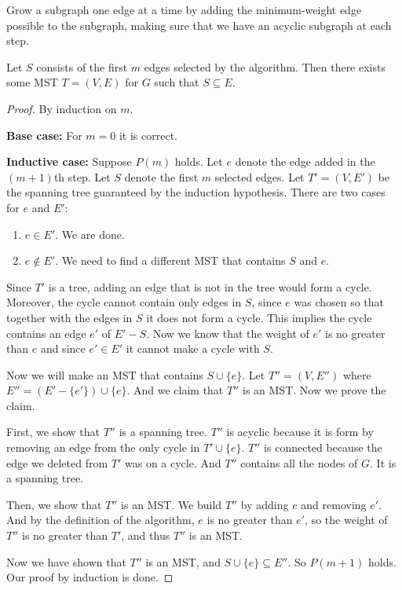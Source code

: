 \documentclass[11pt]{article}
\begin{document}
\begin{definition}
Grow a subgraph one edge at a time by adding the minimum-weight edge possible to the subgraph,
making sure that we have an acyclic subgraph at each step.
\end{definition}

\begin{lemma} \label{lemma:83}
Let $S$ consists of the first $m$ edges selected by the algorithm. Then there exists some MST $T=
(V,E)$ for $G$ such that $S \subseteq E$.
\end{lemma}

\begin{proof}
By induction on $m$.

\textbf{Base case:} For $m=0$ it is correct.

\textbf{Inductive case:} Suppose $P(m)$ holds. Let $e$ denote the edge added in the $(m+1)$th step.
Let $S$ denote the first $m$ selected edges. Let $T'=(V,E')$ be the spanning tree guaranteed by the
induction hypothesis. There are two cases for $e$ and $E'$:
\begin{enumerate}
\item $e \in E'$. We are done.
\item $e \not\in E'$. We need to find a different MST that contains $S$ and $e$.
\end{enumerate}

Since $T'$ is a tree, adding an edge that is not in the tree would form a cycle. Moreover, the cycle
cannot contain only edges in $S$, since $e$ was chosen so that together with the edges in $S$ it does
not form a cycle. This implies the cycle contains an edge $e'$ of $E'-S$. Now we know that the weight
of $e'$ is no greater than $e$ and since $e' \in E'$ it cannot make a cycle with $S$.

Now we will make an MST that contains $S \cup \{e\}$. Let $T''=(V,E'')$ where $E''=(E'-\{e'\})\cup
\{e\}$. And we claim that $T''$ is an MST. Now we prove the claim.

First, we show that $T''$ is a spanning tree. $T''$ is acyclic because it is form by removing an edge
from the only cycle in $T' \cup \{e\}$. $T''$ is connected because the edge we deleted from $T'$ was on
a cycle. And $T''$ contains all the nodes of $G$. It is a spanning tree.

Then, we show that $T''$ is an MST. We build $T''$ by adding $e$ and removing $e'$. And by the
definition of the algorithm, $e$ is no greater than $e'$, so the weight of $T''$ is no greater than
$T'$, and thus $T''$ is an MST.

Now we have shown that $T''$ is an MST, and $S \cup \{e\} \subseteq E''$. So $P(m+1)$ holds. Our proof
by induction is done.
\end{proof}
\end{document}

